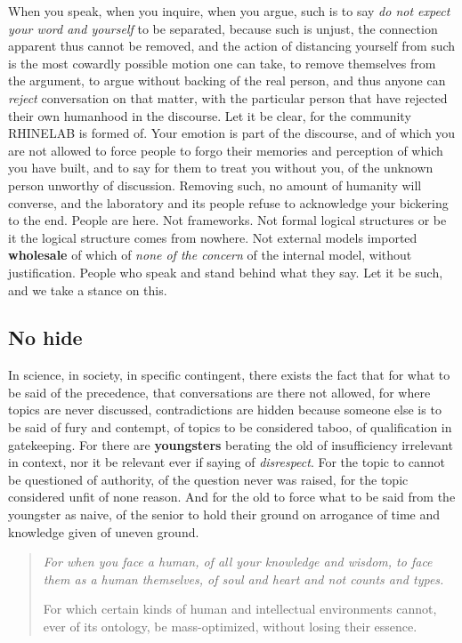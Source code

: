 \documentclass[10pt,a4paper]{article}
\begin{document}
When you speak, when you inquire, when you argue, such is to say \textit{do not expect your word and yourself} to be separated, because such is unjust, the connection apparent thus cannot be removed, and the action of distancing yourself from such is the most cowardly possible motion one can take, to remove themselves from the argument, to argue without backing of the real person, and thus anyone can \textit{reject} conversation on that matter, with the particular person that have rejected their own humanhood in the discourse. Let it be clear, for the community RHINELAB is formed of. Your emotion is part of the discourse, and of which you are not allowed to force people to forgo their memories and perception of which you have built, and to say for them to treat you without you, of the unknown person unworthy of discussion. Removing such, no amount of humanity will converse, and the laboratory and its people refuse to acknowledge your bickering to the end. People are here. Not frameworks. Not formal logical structures or be it the logical structure comes from nowhere. Not external models imported \textbf{wholesale} of which of \textit{none of the concern} of the internal model, without justification. People who speak and stand behind what they say. Let it be such, and we take a stance on this. 

\subsection{No hide}

In science, in society, in specific contingent, there exists the fact that for what to be said of the precedence, that conversations are there not allowed, for where topics are never discussed, contradictions are hidden because someone else is to be said of fury and contempt, of topics to be considered taboo, of qualification in gatekeeping. For there are \textbf{youngsters} berating the old of insufficiency irrelevant in context, nor it be relevant ever if saying of \textit{disrespect}. For the topic to cannot be questioned of authority, of the question never was raised, for the topic considered unfit of none reason. And for the old to force what to be said from the youngster as naive, of the senior to hold their ground on arrogance of time and knowledge given of uneven ground. 

\begin{quote}
    \textit{For when you face a human, of all your knowledge and wisdom, to face them as a human themselves, of soul and heart and not counts and types.}

    For which certain kinds of human and intellectual environments cannot, ever of its ontology, be mass-optimized, without losing their essence.
\end{quote}
\end{document}

